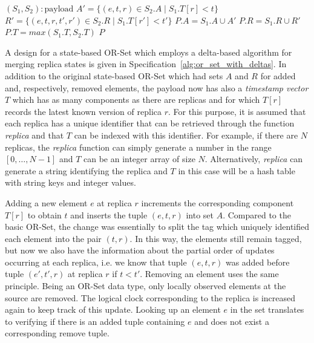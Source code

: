 \begin{algorithm}[t]
{\begin{algorithmic}[1]
 	  \State \Merge $(S_{1}, S_{2}) : \text{payload}$
 	  \State \hspace{\algorithmicindent} \Let $A' = \{(e, t, r) \in S_{2}.A \mid S_{1}.T[r] < t\}$
 	  \State \hspace{\algorithmicindent} \Let $R' = \{(e, t, r, t', r') \in S_{2}.R \mid S_{1}.T[r'] < t'\}$
 	  \State \hspace{\algorithmicindent} \Let $P.A = S_{1}.A \cup A'$
 	  \State \hspace{\algorithmicindent} \Let $P.R = S_{1}.R \cup R'$
 	  \State \hspace{\algorithmicindent} \Let $P.T = max(S_{1}.T, S_{2}.T)$
 	  \State \hspace{\algorithmicindent} \Return $P$
	\end{algorithmic}
 }
\end{algorithm}

A design for a state-based OR-Set which employs a delta-based algorithm
for merging replica states is given in
Specification~\ref{alg:or_set_with_deltas}. In addition to the original
state-based OR-Set which had sets $A$ and $R$ for added and, respectively,
removed elements, the payload now has also a \textit{timestamp vector} $T$ which
has as many components as there are replicas and for which $T[r]$ records the
latest known version of replica $r$. For this purpose, it is assumed that each
replica has a unique identifier that can be retrieved through the function
\textit{replica} and that $T$ can be indexed with this identifier. For example,
if there are $N$ replicas, the \textit{replica} function can simply generate a
number in the range $[0,\ldots,N-1]$ and $T$ can be an integer array of size
$N$. Alternatively, \textit{replica} can generate a string identifying the
replica and $T$ in this case will be a hash table with string keys and integer
values.

Adding a new element $e$ at replica $r$ increments the corresponding component
$T[r]$ to obtain $t$ and inserts the tuple $(e, t, r)$ into set $A$. Compared to
the basic OR-Set, the change was essentially to split the tag which uniquely
identified each element into the pair $(t, r)$. In this way, the elements still
remain tagged, but now we also have the information about the partial order of
updates occurring at each replica, i.e. we know that tuple $(e, t, r)$ was added
before tuple $(e', t', r)$ at replica $r$ if $t < t'$. Removing an element uses
the same principle. Being an OR-Set data type, only locally observed elements at
the source are removed. The logical clock corresponding to the replica is
increased again to keep track of this update. Looking up an element $e$ in the
set translates to verifying if there is an added tuple containing $e$ and
does not exist a corresponding remove tuple.

